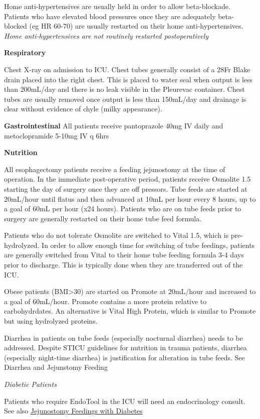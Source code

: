 \documentclass[
  letterpaper,
]{scrbook}
\begin{document}
Home anti-hypertensives are usually held in order to allow
beta-blockade. Patients who have elevated blood pressures once they are
adequately beta-blocked (eg HR 60-70) are usually restarted on their
home anti-hypertensives. \emph{Home anti-hypertensives are not routinely
restarted postoperatively}

\textbf{Respiratory}

Chest X-ray on admission to ICU. Chest tubes generally consist of a 28Fr
Blake drain placed into the right chest. This is placed to water seal
when output is less than 200mL/day and there is no leak visible in the
Pleurevac container. Chest tubes are usually removed once output is less
than 150mL/day and drainage is clear without evidence of chyle (milky
appearance).

\textbf{Gastrointestinal} All patients receive pantoprazole 40mg IV
daily and metoclopramide 5-10mg IV q 6hrs

\textbf{Nutrition}

All esophagectomy patients receive a feeding jejunostomy at the time of
operation. In the immediate post-operative period, patients receive
Osmolite 1.5 starting the day of surgery once they are off pressors.
Tube feeds are started at 20mL/hour until flatus and then advanced at
10mL per hour every 8 hours, up to a goal of 60mL per hour (x24 hours).
Patients who are on tube feeds prior to surgery are generally restarted
on their home tube feed formula.

Patients who do not tolerate Osmolite are switched to Vital 1.5, which
is pre-hydrolyzed. In order to allow enough time for switching of tube
feedings, patients are generally switched from Vital to their home tube
feeding formula 3-4 days prior to discharge. This is typically done when
they are transferred out of the ICU.

Obese patients (BMI\textgreater30) are started on Promote at 20mL/hour
and increased to a goal of 60mL/hour. Promote contains a more protein
relative to carbohydrdates. An alternative is Vital High Protein, which
is similar to Promote but using hydrolyzed proteins.

Diarrhea in patients on tube feeds (especially nocturnal diarrhea) needs
to be addressed. Despite STICU guidelines for nutrition in trauma
patients, diarrhea (especially night-time diarrhea) is justification for
alteration in tube feeds. See Diarrhea and Jejunstomy Feeding

\emph{Diabetic Patients}

Patients who require EndoTool in the ICU will need an endocrinology
consult. See also \hyperref[jejunostomy_diabetes]{Jejunostomy Feedings
with Diabetes}
\end{document}
